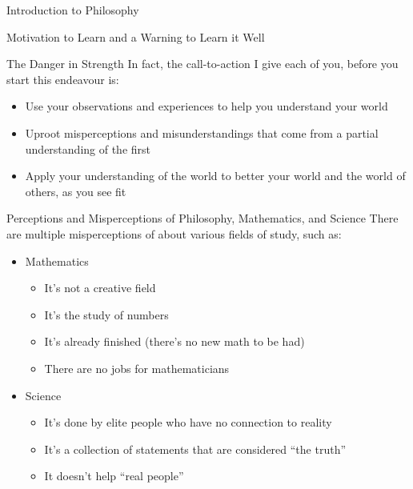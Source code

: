 \begin{chapter}{Introduction to Philosophy}
\begin{section}{Motivation to Learn and a Warning to Learn it Well}
\begin{subsection}{The Danger in Strength}
            In fact, the call-to-action I give each of you, before you start this endeavour is:
            \begin{itemize}
                \item Use your observations and experiences to help you understand your world
                    
                \item Uproot misperceptions and misunderstandings that come from a partial understanding of the first
                    
                \item Apply your understanding of the world to better your world and the world of others, as you see fit
            \end{itemize}
        \end{subsection}
        
        \begin{samepage}
            \begin{subsection}{Perceptions and Misperceptions of Philosophy, Mathematics, and Science}
                There are multiple misperceptions of about various fields of study, such as:
                \begin{itemize}
                    \item Mathematics
                    \begin{itemize}
                        \item It's not a creative field
                        \item It's the study of numbers
                        \item It's already finished (there's no new math to be had)
                        \item There are no jobs for mathematicians
                    \end{itemize}
                    
                    \item Science
                    \begin{itemize}
                        \item It's done by elite people who have no connection to reality
                        \item It's a collection of statements that are considered ``the truth''
                        \item It doesn't help ``real people''
                    \end{itemize}
                    

\end{itemize}
\end{subsection}
\end{samepage}
\end{section}
\end{chapter}
